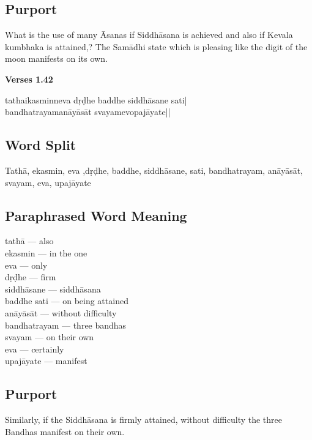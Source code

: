 \subsection*{Purport}

What is the use of many Āsanas if Siddhāsana is achieved and also if Kevala kumbhaka is attained,? The Samādhi state which is pleasing like the digit of the moon manifests on its own. 

\newpage
\noindent \textbf{Verses 1.42}

\begin{shloka}
tathaikasminneva dṛḍhe baddhe siddhāsane sati|\\
bandhatrayamanāyāsāt svayamevopajāyate||
\end{shloka}

\subsection*{Word Split}

Tathā, ekasmin, eva ,dṛḍhe, baddhe, siddhāsane, sati, bandhatrayam, anāyāsāt,  svayam, eva, upajāyate

\subsection*{Paraphrased Word Meaning}

\begin{multicols}{2}
\itemsep=0pt
tathā --- also \\	
ekasmin --- in the one  \\
eva --- only \\
dṛḍhe --- firm \\ 		 
siddhāsane --- siddhāsana	 \\
baddhe sati --- on being attained  \\
anāyāsāt ---  without difficulty  \\
bandhatrayam --- three bandhas	 \\
svayam --- on their own  \\
eva --- certainly  \\
upajāyate --- manifest 
\end{multicols}

\subsection*{Purport}

Similarly, if the Siddhāsana is firmly attained, without difficulty the three Bandhas manifest on their own.   


